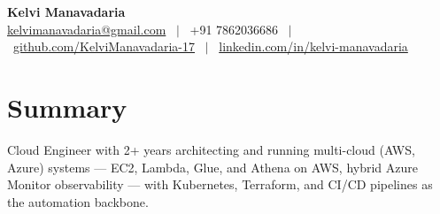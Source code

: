 \documentclass[a4paper,10.999999pt]{article}
\begin{document}
    \pagestyle{empty}



    \begin{center}
    \LARGE{\textbf{Kelvi Manavadaria}} \\[1.5pt]
    {\small
    \href{mailto:kelvimanavadaria@gmail.com}{kelvimanavadaria@gmail.com} \ $|$ \
    +91 7862036686 \ $|$ \
    \href{https://github.com/KelviManavadaria-17}{github.com/KelviManavadaria-17} \ $|$ \
    \href{https://www.linkedin.com/in/kelvi-manavadaria/}{linkedin.com/in/kelvi-manavadaria}
    }
    \end{center}

    \vspace{0.5pt}


    \section{Summary}
Cloud Engineer with 2+ years architecting and running multi-cloud (AWS, Azure) systems — EC2, Lambda, Glue, and Athena on AWS, hybrid Azure Monitor observability — with Kubernetes, Terraform, and CI/CD pipelines as the automation backbone.

\end{document}
